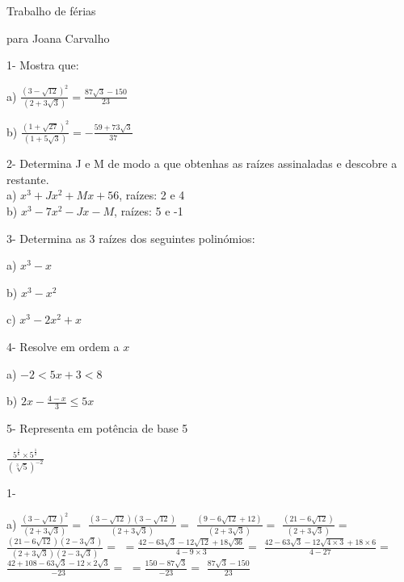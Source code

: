 \documentclass[11pt]{article}
\begin{document}
\begin{center}
{\huge Trabalho de férias}
\end{center}
\begin{center}
{\huge para Joana Carvalho}
\end{center}
\vspace{10mm}

{\large 1- Mostra que:}
\begin{multicols}{2}
a) $ \frac {(3 - \sqrt{12})^{2} }  {(2 + 3 \sqrt{3} )}= \frac{87 \sqrt{3} - 150}{23}$

b) $ \frac {(1 + \sqrt{27})^{2} }  {(1 + 5 \sqrt{3} )}= -\frac{59 + 73 \sqrt{3}}{37}$\\
\end{multicols}
\vspace{5mm}

{\large 2- Determina J e M de modo a que obtenhas as raízes assinaladas e descobre a restante.}\\

a) $x^{3}+Jx^{2} + Mx+56$, raízes: 2 e 4\\

b) $x^3-7x^2-Jx-M$, raízes: 5 e -1\\
\vspace{5mm}

{\large 3- Determina as 3 raízes dos seguintes polinómios:}
\begin{multicols}{3}
a) $x^3-x$

b) $x^3-x^2$

c) $x^3-2x^2+x$
\end{multicols}
\vspace{5mm}

{\large 4- Resolve em ordem a $x$}
\begin{multicols}{2}
a) $-2<5x+3<8$

b) $2x-\frac{4-x}{3}\leq5x$
\end{multicols}
\vspace{5mm}

{\large 5- Representa em potência de base 5}

\vspace{5mm}
\begin{center} 
{\large $\frac{5^{\frac{1}{6}}\times5^{\frac{1}{2}}}{(\sqrt[3]{5})^{-2}}$}
\end{center}

\break
{\large 1-}

\vspace{5mm}
a)\hspace{5mm} $ \frac {(3 - \sqrt{12})^{2} }  {(2 + 3 \sqrt{3} )}=$
   $ \frac{(3-\sqrt{12})(3-\sqrt{12})}{(2+3\sqrt{3})}=$
   $ \frac{(9-6\sqrt{12}+12)}{(2+3\sqrt{3})}=$
   $ \frac{(21-6\sqrt{12})}{(2+3\sqrt{3})}=$
   $ \frac{(21-6\sqrt{12})(2-3\sqrt{3})}{(2+3\sqrt{3})(2-3\sqrt{3})}=$
   $= \frac{42-63\sqrt{3}-12\sqrt{12}+18\sqrt{36}}{4-9\times3}=$
   $ \frac{42-63\sqrt{3}-12\sqrt{4\times3}+18\times6}{4-27}=$
   $ \frac{42+108-63\sqrt{3}-12\times2\sqrt{3}}{-23}=$
   $= \frac{150-87\sqrt{3}}{-23}=$
   $\frac{87 \sqrt{3} - 150}{23}$ 
\end{document}
